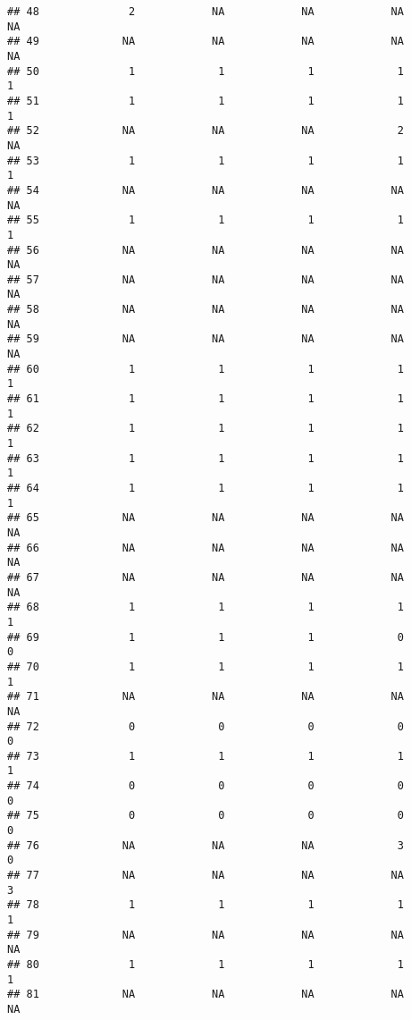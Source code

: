\documentclass[
]{article}
\begin{document}
\begin{verbatim}
## 48              2            NA            NA            NA            NA
## 49             NA            NA            NA            NA            NA
## 50              1             1             1             1             1
## 51              1             1             1             1             1
## 52             NA            NA            NA             2            NA
## 53              1             1             1             1             1
## 54             NA            NA            NA            NA            NA
## 55              1             1             1             1             1
## 56             NA            NA            NA            NA            NA
## 57             NA            NA            NA            NA            NA
## 58             NA            NA            NA            NA            NA
## 59             NA            NA            NA            NA            NA
## 60              1             1             1             1             1
## 61              1             1             1             1             1
## 62              1             1             1             1             1
## 63              1             1             1             1             1
## 64              1             1             1             1             1
## 65             NA            NA            NA            NA            NA
## 66             NA            NA            NA            NA            NA
## 67             NA            NA            NA            NA            NA
## 68              1             1             1             1             1
## 69              1             1             1             0             0
## 70              1             1             1             1             1
## 71             NA            NA            NA            NA            NA
## 72              0             0             0             0             0
## 73              1             1             1             1             1
## 74              0             0             0             0             0
## 75              0             0             0             0             0
## 76             NA            NA            NA             3             0
## 77             NA            NA            NA            NA             3
## 78              1             1             1             1             1
## 79             NA            NA            NA            NA            NA
## 80              1             1             1             1             1
## 81             NA            NA            NA            NA            NA

\end{verbatim}
\end{document}
